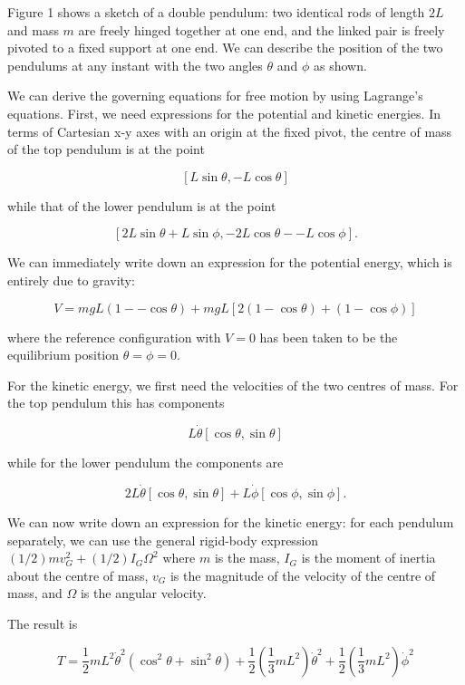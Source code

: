   Figure 1 shows a sketch of a double pendulum: two identical rods of length 
  $2L$ and mass $m$ are freely hinged together at one end, and the linked pair 
  is freely pivoted to a fixed support at one end. We can describe the position 
  of the two pendulums at any instant with the two angles $\theta$ and $\phi$ 
  as shown. 


  We can derive the governing equations for free motion by using Lagrange's 
  equations. First, we need expressions for the potential and kinetic energies. 
  In terms of Cartesian x-y axes with an origin at the fixed pivot, the centre 
  of mass of the top pendulum is at the point 

  $$[L \sin \theta, -L \cos \theta] \tag{1}$$ 

  while that of the lower pendulum is at the point 

  $$[2L \sin \theta + L \sin \phi, -2L \cos \theta -- L \cos \phi]. \tag{2}$$ 

  We can immediately write down an expression for the potential energy, which 
  is entirely due to gravity: 

  $$V=mgL(1 -- \cos \theta) +mgL[2(1- \cos \theta) + (1-\cos \phi)] \tag{3}$$ 

  where the reference configuration with $V=0$ has been taken to be the 
  equilibrium position $\theta=\phi=0$. 

  For the kinetic energy, we first need the velocities of the two centres of 
  mass. For the top pendulum this has components 

  $$L \dot{\theta} [\cos \theta, \sin \theta] \tag{4}$$ 

  while for the lower pendulum the components are 

  $$2L \dot{\theta} [\cos \theta, \sin \theta] + L \dot{\phi} [\cos \phi, \sin 
  \phi]. \tag{5}$$ 

  We can now write down an expression for the kinetic energy: for each pendulum 
  separately, we can use the general rigid-body expression $(1/2)m v_G^2 + 
  (1/2) I_G \Omega^2$ where $m$ is the mass, $I_G$ is the moment of inertia 
  about the centre of mass, $v_G$ is the magnitude of the velocity of the 
  centre of mass, and $\Omega$ is the angular velocity. 

  The result is 

  $$T=\dfrac{1}{2}mL^2 \dot{\theta}^2 (\cos^2 \theta + \sin^2 \theta) 
  +\dfrac{1}{2}\left(\dfrac{1}{3}mL^2\right) 
  \dot{\theta}^2+\dfrac{1}{2}\left(\dfrac{1}{3}mL^2\right) \dot{\phi}^2$$ 

